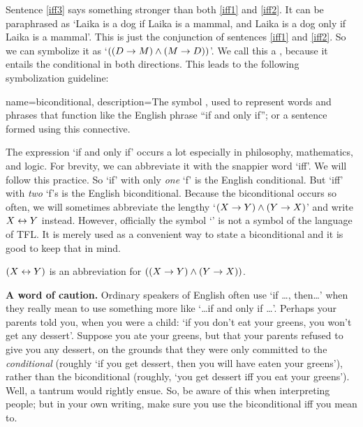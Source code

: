 Sentence \ref{iff3} says something stronger than both \ref{iff1} and \ref{iff2}. It can be paraphrased as `Laika is a dog if Laika is a mammal, and Laika is a dog only if Laika is a mammal'. This is just the conjunction of sentences \ref{iff1} and \ref{iff2}. So we can symbolize it as `$((D \rightarrow M) \mathbin{\wedge} (M \rightarrow D))$'. We call this a , because it entails the conditional in both directions. This leads to the following symbolization guideline:

{
name=biconditional,
description={The symbol \eiff, used to represent words and phrases that function like the English phrase ``if and only if''; or a sentence formed using this connective.}}


The expression `if and only if' occurs a lot especially in philosophy, mathematics, and logic. For brevity, we can abbreviate it with the snappier word `iff'. We will follow this practice. So `if' with only \emph{one} `f' is the English conditional. But `iff' with \emph{two} `f's is the English biconditional. Because the biconditional occurs so often, we will sometimes abbreviate the lengthy `$(X\rightarrow Y)\mathbin{\wedge}(Y\rightarrow X)$' and write $X\leftrightarrow Y$ instead. However, officially the symbol `\eiff' is not a symbol of the language of TFL. It is merely used as a convenient way to state a biconditional and it is good to keep that in mind.

\begin{highlighted}
	$(X\leftrightarrow Y)$ is an abbreviation for $((X\rightarrow Y)\mathbin{\wedge}(Y\rightarrow X))$.
\end{highlighted}

\textbf{A word of caution.} Ordinary speakers of English often use `if \ldots, then\ldots' when they really mean to use something more like `\ldots if and only if \ldots'. Perhaps your parents told you, when you were a child: `if you don't eat your greens, you won't get any dessert'. Suppose you ate your greens, but that your parents refused to give you any dessert, on the grounds that they were only committed to the \emph{conditional} (roughly `if you get dessert, then you will have eaten your greens'), rather than the biconditional (roughly, `you get dessert iff you eat your greens'). Well, a tantrum would rightly ensue. So, be aware of this when interpreting people; but in your own writing, make sure you use the biconditional iff you mean to.

